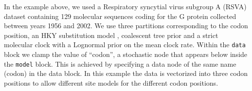 \documentclass[10pt,letterpaper,table]{article}
\begin{document}
In the example above, we used a Respiratory syncytial virus subgroup A (RSVA) dataset \cite{zlateva2004molecular, zlateva2005genetic} containing 129 molecular sequences coding for the G protein collected between years 1956 and 2002. 
We use three partitions corresponding to the codon position, an HKY substitution model \cite{hasegawa1985dating}, coalescent tree prior \cite{kingman82} and a strict molecular clock with a Lognormal prior on the mean clock rate. 
Within the \texttt{data} block we clamp the value of ``codon'', a stochastic node that appears below inside the \texttt{model} block. This is achieved by specifying a data node of the same name (codon) in the data block. In this example the data is vectorized into three codon positions to allow different site models for the different codon positions.




\end{document}
